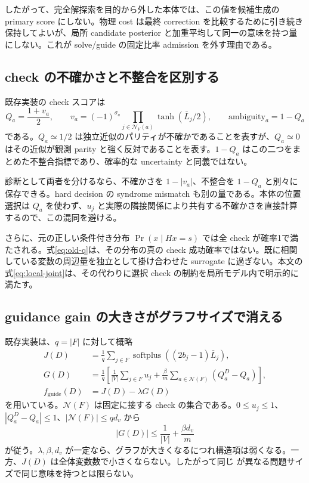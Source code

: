 \documentclass[a4paper,11pt]{ltjsarticle}
\numberwithin{equation}{section}
\theoremstyle{definition}
\newcommand{\N}{\mathcal N}
\newcommand{\softplus}{\operatorname{softplus}}
\newcommand{\code}[1]{\texttt{\detokenize{#1}}}
\begin{document}
したがって、完全解探索を目的から外した本体では、この値を候補生成の primary score にしない。物理 cost は最終 correction を比較するために引き続き保持してよいが、局所 candidate posterior と加重平均して同一の意味を持つ量にしない。これが solve/guide の固定比率 admission を外す理由である。

\subsection{check の不確かさと不整合を区別する}
既存実装の check スコアは
\begin{equation}
 Q_a=\frac{1+v_a}{2},\qquad
 v_a=(-1)^{\sigma_a}
          \prod_{j\in\N_V(a)}\tanh(\bar L_j/2),
 \qquad \mathrm{ambiguity}_a=1-Q_a
 \label{eq:old-q}
\end{equation}
である\cite{repo}。$Q_a\simeq1/2$ は独立近似のパリティが不確かであることを表すが、$Q_a\simeq0$ はその近似が観測 parity と強く反対であることを表す。$1-Q_a$ はこの二つをまとめた不整合指標であり、確率的な uncertainty と同義ではない。

診断として両者を分けるなら、不確かさを $1-|v_a|$、不整合を $1-Q_a$ と別々に保存できる。hard decision の syndrome mismatch も別の量である。本体の位置選択は $Q_a$ を使わず、$u_j$ と実際の隣接関係により共有する不確かさを直接計算するので、この混同を避ける。

さらに、元の正しい条件付き分布 $\Pr(x\mid Hx=s)$ では全 check が確率1で満たされる。式\eqref{eq:old-q}は、その分布の真の check 成功確率ではない。既に相関している変数の周辺量を独立として掛け合わせた surrogate に過ぎない。本文の式\eqref{eq:local-joint}は、その代わりに選択 check の制約を局所モデル内で明示的に満たす。

\subsection{guidance gain の大きさがグラフサイズで消える}
既存実装は、$q=|F|$ に対して概略
\begin{align}
 J(D)&=\frac1q\sum_{j\in F}
       \softplus((2b_j-1)\bar L_j),\\
 G(D)&=\frac1q\left[
 \frac1{|V|}\sum_{j\in F}u_j+
 \frac\beta m\sum_{a\in\N(F)}(Q_a^D-Q_a)\right],\\
 f_{\mathrm{guide}}(D)&=J(D)-\lambda G(D)
 \label{eq:old-guide}
\end{align}
を用いている\cite{repo}。$\N(F)$ は固定に接する check の集合である。$0\le u_j\le1$、$|Q_a^D-Q_a|\le1$、$|\N(F)|\le qd_v$ から
\begin{equation}
 |G(D)|\le\frac1{|V|}+\frac{\beta d_v}{m}
 \label{eq:gain-bound}
\end{equation}
が従う。$\lambda,\beta,d_v$ が一定なら、グラフが大きくなるにつれ構造項は弱くなる。一方、$J(D)$ は全体変数数で小さくならない。したがって同じ \code{guidance_strength} が異なる問題サイズで同じ意味を持つとは限らない。
\end{document}
